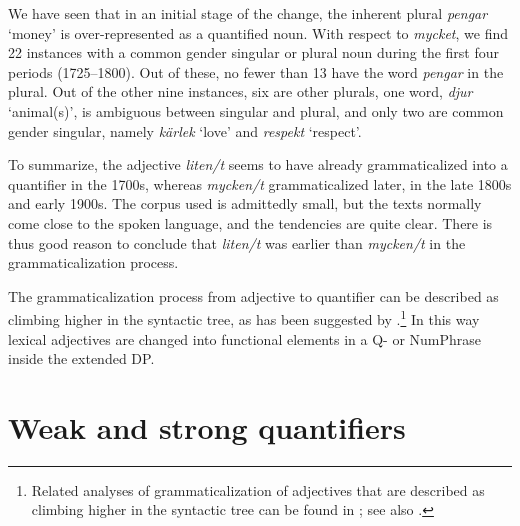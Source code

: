 \documentclass[output=paper]{langscibook}
\begin{document}
We have seen that in an initial stage of the change, the inherent plural \textit{pengar} ‘money’ is over-represented as a quantified noun. With respect to \textit{mycket}, we find 22 instances with a common gender singular or plural noun during the first four periods (1725–1800). Out of these, no fewer than 13 have the word \textit{pengar} in the plural. Out of the other nine instances, six are other plurals, one word, \textit{djur} ‘animal(s)’, is ambiguous between singular and plural, and only two are common gender singular, namely \textit{kärlek} ‘love’ and \textit{respekt} ‘respect’. 



To summarize, the adjective \textit{liten/t} seems to have already grammaticalized into a quantifier in the 1700s, whereas \textit{mycken/t} grammaticalized later, in the late 1800s and early 1900s. The corpus used is admittedly small, but the texts normally come close to the spoken language, and the tendencies are quite clear. There is thus good reason to conclude that \textit{liten/t} was earlier than \textit{mycken/t} in the grammaticalization process. 



The grammaticalization process from adjective to quantifier can be described as climbing higher in the syntactic tree, as has been suggested by \textcite{RobertsRoussou1999, RobertsRoussou2003}.\footnote{Related analyses of grammaticalization of adjectives that are described as climbing higher in the syntactic tree can be found in \citet{Oxford2017}; see also .} In this way lexical adjectives are changed into functional elements in a Q- or NumPhrase inside the extended DP.


\section{Weak and strong quantifiers}\label{sec:delsing:5}
\end{document}
